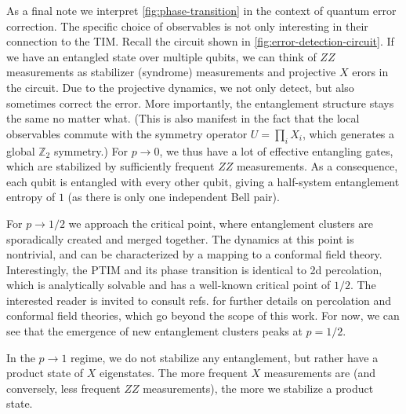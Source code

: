 As a final note we interpret \cref{fig:phase-transition} in the context of
quantum error correction. The specific choice of observables is not only
interesting in their connection to the TIM.  Recall the circuit shown in
\cref{fig:error-detection-circuit}. If we have an entangled state over multiple
qubits, we can think of $ZZ$ measurements as stabilizer (syndrome) measurements
and projective $X$ erors in the circuit. Due to the projective dynamics, we not
only detect, but also sometimes correct the error. More importantly, the
entanglement structure stays the same no matter what. (This is also manifest in
the fact that the local observables commute with the symmetry operator
$U=\prod_i X_i$, which generates a global $\mathbb{Z}_2$ symmetry.) For $p\to
0$, we thus have a lot of effective entangling gates, which are stabilized by
sufficiently frequent $ZZ$ measurements. As a consequence, each qubit is
entangled with every other qubit, giving a half-system entanglement entropy of
$1$ (as there is only one independent Bell pair).

For $p \to 1 /2$ we approach the critical point,
where entanglement clusters are sporadically created and merged together. The
dynamics at this point is nontrivial, and can be characterized by a mapping to
a conformal field theory. Interestingly, the PTIM and its phase transition is
identical to 2d percolation, which is analytically solvable and has a
well-known critical point of $1 /2$. The interested reader is invited to
consult refs.
\cite{aharonyIntroductionPercolationTheory2017,difrancescoConformalFieldTheory1997}
for further details on percolation and conformal field theories, which go
beyond the scope of this work. For now, we can see that the emergence of new
entanglement clusters peaks at $p = 1 /2$.

In the $p\to 1$ regime, we do not stabilize any entanglement, but rather
have a product state of $X$ eigenstates. The more frequent $X$ measurements are
(and conversely, less frequent $ZZ$ measurements), the more we stabilize a
product state.



